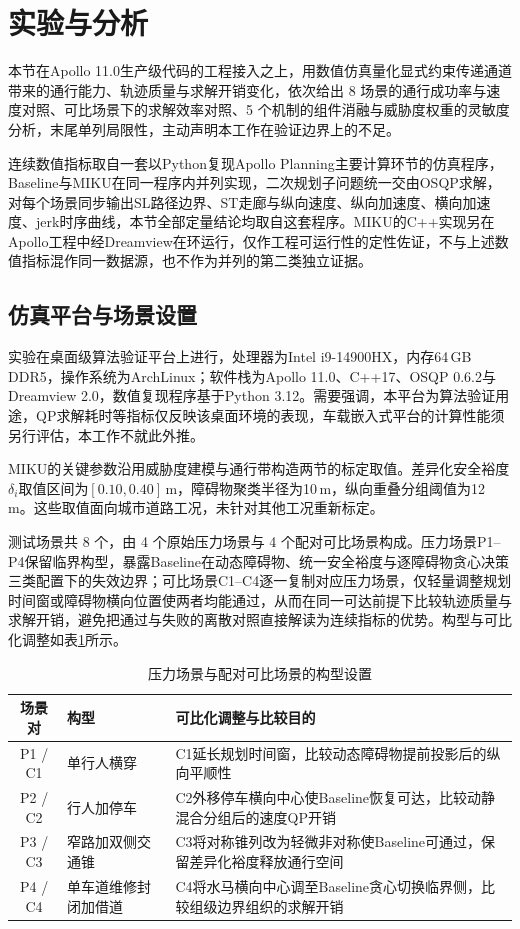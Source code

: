 \documentclass[a4paper,zihao=5]{ctexart}
\theoremstyle{definition}
\begin{document}
\section{实验与分析}
\label{sec:experiment}

本节在Apollo 11.0生产级代码的工程接入之上，用数值仿真量化显式约束传递通道带来的通行能力、轨迹质量与求解开销变化，依次给出 8 场景的通行成功率与速度对照、可比场景下的求解效率对照、5 个机制的组件消融与威胁度权重的灵敏度分析，末尾单列局限性，主动声明本工作在验证边界上的不足。

连续数值指标取自一套以Python复现Apollo Planning主要计算环节的仿真程序，Baseline与MIKU在同一程序内并列实现，二次规划子问题统一交由OSQP求解，对每个场景同步输出SL路径边界、ST走廊与纵向速度、纵向加速度、横向加速度、jerk时序曲线，本节全部定量结论均取自这套程序。MIKU的C++实现另在Apollo工程中经Dreamview在环运行，仅作工程可运行性的定性佐证，不与上述数值指标混作同一数据源，也不作为并列的第二类独立证据。

\subsection{仿真平台与场景设置}
\label{subsec:exp_setup}

实验在桌面级算法验证平台上进行，处理器为Intel i9-14900HX，内存64\,GB DDR5，操作系统为ArchLinux；软件栈为Apollo 11.0、C++17、OSQP 0.6.2与Dreamview 2.0，数值复现程序基于Python 3.12。需要强调，本平台为算法验证用途，QP求解耗时等指标仅反映该桌面环境的表现，车载嵌入式平台的计算性能须另行评估，本工作不就此外推。

MIKU的关键参数沿用威胁度建模与通行带构造两节的标定取值。差异化安全裕度$\delta_i$取值区间为$[0.10, 0.40]$\,m，障碍物聚类半径为10\,m，纵向重叠分组阈值为12\,m。这些取值面向城市道路工况，未针对其他工况重新标定。

测试场景共 8 个，由 4 个原始压力场景与 4 个配对可比场景构成。压力场景P1--P4保留临界构型，暴露Baseline在动态障碍物、统一安全裕度与逐障碍物贪心决策三类配置下的失效边界；可比场景C1--C4逐一复制对应压力场景，仅轻量调整规划时间窗或障碍物横向位置使两者均能通过，从而在同一可达前提下比较轨迹质量与求解开销，避免把通过与失败的离散对照直接解读为连续指标的优势。构型与可比化调整如表\ref{tab:exp_scenarios}所示。

\begin{table}[htbp]
\centering
\caption{压力场景与配对可比场景的构型设置}
\label{tab:exp_scenarios}
\small
\begin{tabular}{c l p{7.4cm}}
\toprule
\textbf{场景对} & \textbf{构型} & \textbf{可比化调整与比较目的} \\
\midrule
P1 / C1 & 单行人横穿 & C1延长规划时间窗，比较动态障碍物提前投影后的纵向平顺性 \\
P2 / C2 & 行人加停车 & C2外移停车横向中心使Baseline恢复可达，比较动静混合分组后的速度QP开销 \\
P3 / C3 & 窄路加双侧交通锥 & C3将对称锥列改为轻微非对称使Baseline可通过，保留差异化裕度释放通行空间 \\
P4 / C4 & 单车道维修封闭加借道 & C4将水马横向中心调至Baseline贪心切换临界侧，比较组级边界组织的求解开销 \\
\bottomrule
\end{tabular}
\end{table}
\end{document}
